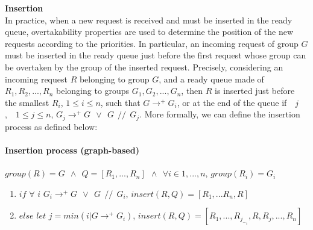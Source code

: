 \documentclass[11pt]{report}
\begin{document}
\textbf{Insertion}\\
In practice, when a new request is received and must be inserted in the ready queue, overtakability properties are used to determine the position of the new requests according to the priorities.
In particular, an incoming request of group $G$ must be inserted in the ready queue just before the first request whose group can be overtaken by the group of the inserted request. Precisely, 
considering an incoming request $R$ belonging to group $G$, and a ready queue made of $R_1,R_2,...,R_n$ belonging to groups $G_1,G_2,...,G_n$, then $R$ is inserted just before the smallest $R_i$, $1 \le i \le n$, such that $G\longrightarrow^{+}G_i$, or at the end of the queue if~\ \forall $j$,~\ $1 \le j \le n$,  $G_j\longrightarrow^{+}G~\ \vee~\ G~\ //~\ G_j$.
More formally, we can define the insertion process as defined below:
\paragraph{Insertion process (graph-based)}
$group(R)=G~\ \wedge~\ Q=[R_1,...,R_n]~\ \wedge~\ \forall i \in 1,...,n$, $group(R_i)=G_i$
\begin{enumerate}
\item $if$ $\forall$ $i$ $G_i\longrightarrow^{+}G~\ \vee~\ G~\ //~\ G_i$, $insert(R,Q)=[R_1,...R_n,R]$
\item $else$ $let$ $j=min({i|G\longrightarrow^{+}G_i})$, $insert(R, Q)=[R_1,...,R_j_-_1,R,R_j,...,R_n]$
\end{enumerate} 
\end{document}
